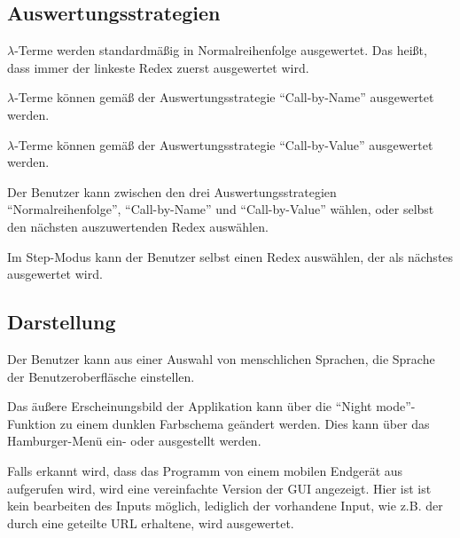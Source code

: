 \documentclass[parskip=full,11pt,twoside]{scrartcl}
\begin{document}
\subsection{Auswertungsstrategien}

$\lambda$-Terme werden standardmäßig in Normalreihenfolge ausgewertet. Das heißt, dass immer der linkeste Redex zuerst ausgewertet wird.

$\lambda$-Terme können gemäß der Auswertungsstrategie \enquote{Call-by-Name} ausgewertet werden.

$\lambda$-Terme können gemäß der Auswertungsstrategie \enquote{Call-by-Value} ausgewertet werden.

Der Benutzer kann zwischen den drei Auswertungsstrategien \enquote{Normalreihenfolge}, \enquote{Call-by-Name} und \enquote{Call-by-Value} wählen, oder selbst den nächsten auszuwertenden Redex auswählen.

Im Step-Modus kann der Benutzer selbst einen Redex auswählen, der als nächstes ausgewertet wird.




\subsection{Darstellung}

Der Benutzer kann aus einer Auswahl von menschlichen Sprachen, die Sprache der Benutzeroberfläsche einstellen.

Das äußere Erscheinungsbild der Applikation kann über die \enquote{Night mode}-Funktion zu einem dunklen Farbschema geändert werden. Dies kann über das Hamburger-Menü ein- oder ausgestellt werden.

Falls erkannt wird, dass das Programm von einem mobilen Endgerät aus aufgerufen wird, wird eine vereinfachte Version der GUI angezeigt. Hier ist ist kein bearbeiten des Inputs möglich, lediglich der vorhandene Input, wie z.B. der durch eine geteilte URL erhaltene, wird ausgewertet.
\end{document}
